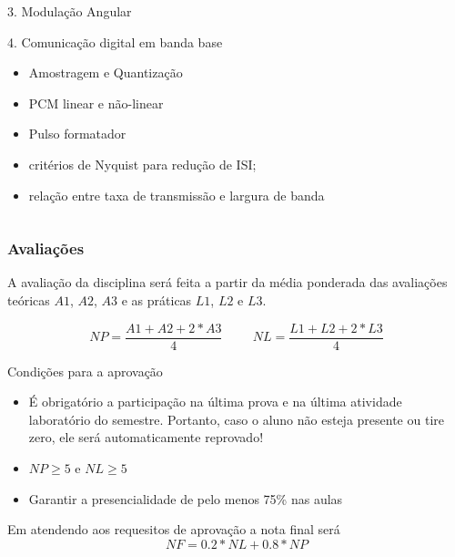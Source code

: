 \documentclass[10pt,hyperref={pdfpagemode=FullScreen},aspectratio=169]{beamer}
\begin{document}
\begin{frame}
\begin{columns}[T]
\begin{column}{0.5\textwidth}
\begin{block}{3. Modulação Angular}
    \end{block}
  
    \begin{block}{4. Comunicação digital em banda base }
      \begin{itemize}
        \item Amostragem e Quantização
        \item PCM linear e não-linear
        \item Pulso formatador
        \item critérios de Nyquist para redução de ISI; 
        \item relação entre taxa de transmissão e largura de banda
      \end{itemize}
    \end{block}
  \end{column}
\end{columns}
  
\end{frame}



\begin{frame}
  \frametitle{Avaliações}

  A avaliação da disciplina será feita a partir da média ponderada das avaliações teóricas $A1$, $A2$, $A3$ e as práticas $L1$, $L2$ e $L3$.
  

  \begin{equation*}
      NP =  \frac{A1 + A2 + 2*A3}{4} \hspace{1cm} NL =  \frac{L1 + L2 + 2*L3}{4}
  \end{equation*}
  

  \begin{block}{Condições para a aprovação}
    \begin{itemize}
      \item É obrigatório a participação na última prova e na última atividade laboratório do semestre. Portanto, caso o aluno não esteja presente ou tire zero, ele será automaticamente reprovado!
      \item $ NP \geq 5 $ e $ NL \geq 5 $
      \item Garantir a presencialidade de pelo menos 75\% nas aulas
    \end{itemize}
  Em atendendo  aos requesitos de aprovação a nota final será
  $$
  NF = 0.2*NL + 0.8*NP
  $$
  \end{block}
  
\end{frame}
\end{document}
